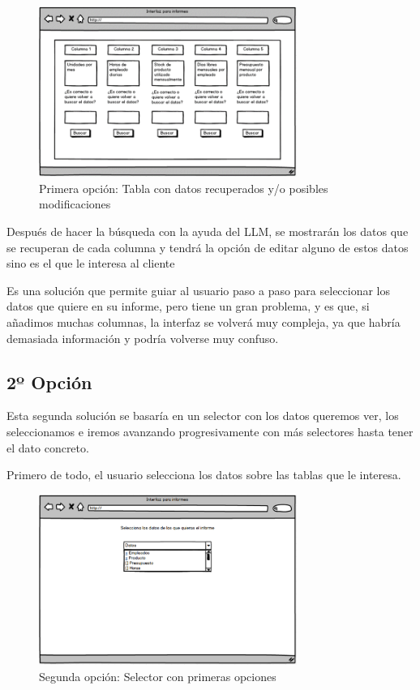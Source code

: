 \begin{figure}[hp!]
    \centering
    \includegraphics[width=0.75\textwidth]{imaxes/iteracion1.2.png}
    \caption{Primera opción: Tabla con datos recuperados y/o posibles modificaciones}
    \label{fig:iteracion1.2}
\end{figure}

Después de hacer la búsqueda con la ayuda del LLM, se mostrarán los datos que se recuperan de cada columna y tendrá la opción de editar alguno de estos datos sino es el que le interesa al cliente
  
Es una solución que permite guiar al usuario paso a paso para seleccionar los datos que quiere en su informe, pero tiene un gran problema, y es que, si añadimos muchas columnas, la interfaz se volverá muy compleja, ya que habría demasiada información y podría volverse muy confuso.

\subsection{2º Opción}

Esta segunda solución se basaría en un selector con los datos queremos ver, los seleccionamos e iremos avanzando progresivamente con más selectores hasta tener el dato concreto.

Primero de todo, el usuario selecciona los datos sobre las tablas que le interesa.

\begin{figure}[hp!]
    \centering
    \includegraphics[width=0.75\textwidth]{imaxes/iteracion1.3.png}
    \caption{Segunda opción: Selector con primeras opciones}
    \label{fig:iteracion1.3}
\end{figure}

